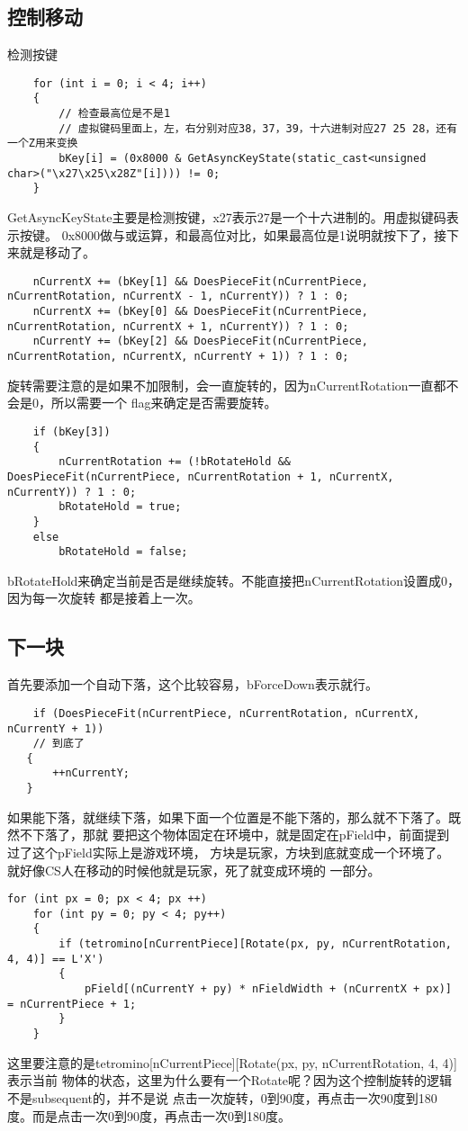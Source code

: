 \documentclass{article}
\begin{document}
\begin{sloppypar}
\subsection{控制移动}
检测按键
\begin{lstlisting}
	for (int i = 0; i < 4; i++)
	{   
		// 检查最高位是不是1
		// 虚拟键码里面上，左，右分别对应38，37，39，十六进制对应27 25 28，还有一个Z用来变换
		bKey[i] = (0x8000 & GetAsyncKeyState(static_cast<unsigned char>("\x27\x25\x28Z"[i]))) != 0;
	}
\end{lstlisting}
GetAsyncKeyState主要是检测按键，x27表示27是一个十六进制的。用虚拟键码表示按键。
0x8000做与或运算，和最高位对比，如果最高位是1说明就按下了，接下来就是移动了。
\begin{lstlisting}
	nCurrentX += (bKey[1] && DoesPieceFit(nCurrentPiece, nCurrentRotation, nCurrentX - 1, nCurrentY)) ? 1 : 0;
	nCurrentX += (bKey[0] && DoesPieceFit(nCurrentPiece, nCurrentRotation, nCurrentX + 1, nCurrentY)) ? 1 : 0;
	nCurrentY += (bKey[2] && DoesPieceFit(nCurrentPiece, nCurrentRotation, nCurrentX, nCurrentY + 1)) ? 1 : 0;
\end{lstlisting}
旋转需要注意的是如果不加限制，会一直旋转的，因为nCurrentRotation一直都不会是0，所以需要一个
flag来确定是否需要旋转。
\begin{lstlisting}
	if (bKey[3])
	{
		nCurrentRotation += (!bRotateHold && DoesPieceFit(nCurrentPiece, nCurrentRotation + 1, nCurrentX, nCurrentY)) ? 1 : 0;
		bRotateHold = true;
	}
	else
		bRotateHold = false;
\end{lstlisting}
bRotateHold来确定当前是否是继续旋转。不能直接把nCurrentRotation设置成0，因为每一次旋转
都是接着上一次。

\subsection{下一块}
首先要添加一个自动下落，这个比较容易，bForceDown表示就行。
\begin{lstlisting}
	if (DoesPieceFit(nCurrentPiece, nCurrentRotation, nCurrentX, nCurrentY + 1))
	// 到底了
   {
	   ++nCurrentY;
   }
\end{lstlisting}
如果能下落，就继续下落，如果下面一个位置是不能下落的，那么就不下落了。既然不下落了，那就
要把这个物体固定在环境中，就是固定在pField中，前面提到过了这个pField实际上是游戏环境，
方块是玩家，方块到底就变成一个环境了。就好像CS人在移动的时候他就是玩家，死了就变成环境的
一部分。
\begin{lstlisting}
for (int px = 0; px < 4; px ++)
	for (int py = 0; py < 4; py++)
	{
		if (tetromino[nCurrentPiece][Rotate(px, py, nCurrentRotation, 4, 4)] == L'X')
		{
			pField[(nCurrentY + py) * nFieldWidth + (nCurrentX + px)] = nCurrentPiece + 1;
		}
	}
\end{lstlisting}
这里要注意的是tetromino[nCurrentPiece][Rotate(px, py, nCurrentRotation, 4, 4)]表示当前
物体的状态，这里为什么要有一个Rotate呢？因为这个控制旋转的逻辑不是subsequent的，并不是说
点击一次旋转，0到90度，再点击一次90度到180度。而是点击一次0到90度，再点击一次0到180度。


\end{sloppypar}
\end{document}
